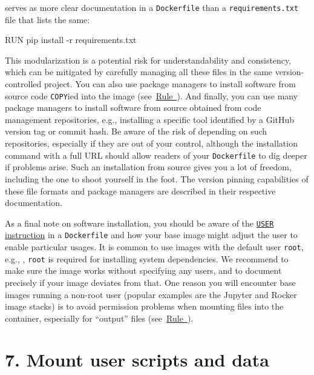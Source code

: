 \documentclass[10pt,letterpaper]{article}
\newenvironment{Shaded}{\begin{snugshade}}{\end{snugshade}}
\newcommand{\ExtensionTok}[1]{#1}
\newcommand{\NormalTok}[1]{#1}
\begin{document}
serves as more clear documentation in a \texttt{Dockerfile} than a
\texttt{requirements.txt} file that lists the same:

\begin{Shaded}
\begin{Highlighting}[]
\ExtensionTok{RUN}\NormalTok{ pip install -r requirements.txt}
\end{Highlighting}
\end{Shaded}

This modularization is a potential risk for understandability and
consistency, which can be mitigated by carefully managing all these
files in the same version-controlled project. You can also use package
managers to install software from source code \texttt{COPY}ied into the
image (see~\hyperref[{rule:mount}]{Rule~}). And
finally, you can use many package managers to install software from
source obtained from code management repositories, e.g., installing a
specific tool identified by a GitHub version tag or commit hash. Be
aware of the risk of depending on such repositories, especially if they
are out of your control, although the installation command with a full
URL should allow readers of your \texttt{Dockerfile} to dig deeper if
problems arise. Such an installation from source gives you a lot of
freedom, including the one to shoot yourself in the foot. The version
pinning capabilities of these file formats and package managers are
described in their respective documentation.

As a final note on software installation, you should be aware of the
\href{https://docs.docker.com/engine/reference/builder/\#user}{\texttt{USER}
instruction} in a \texttt{Dockerfile} and how your base image might
adjust the user to enable particular usages. It is common to use images
with the default user \texttt{root}, e.g., , \texttt{root} is required
for installing system dependencies. We recommend to make sure the image
works without specifying any users, and to document precisely if your
image deviates from that. One reason you will encounter base images
running a non-root user (popular examples are the Jupyter and Rocker
image stacks) is to avoid permission problems when mounting files into
the container, especially for ``output'' files
(see~\hyperref[{rule:mount}]{Rule~}).

\hypertarget{mount-user-scripts-and-data}{%
\section*{7. Mount user scripts and
data}\label{mount-user-scripts-and-data}}
\end{document}
